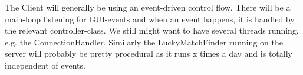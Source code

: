 The Client will generally be using an event-driven control flow. There will be a main-loop listening for GUI-events and when an event happens, it is handled by the relevant controller-class. We still might want to have several threads running, e.g. the ConnectionHandler. Similarly the LuckyMatchFinder running on the server will probably be pretty procedural as it runs x times a day and is totally independent of events.
